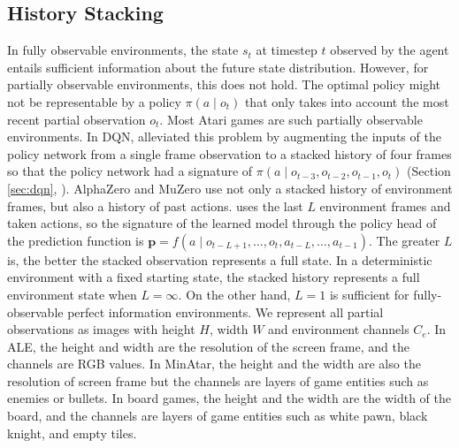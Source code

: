 \subsection{History Stacking} \label{sec:history_stacking}
In fully observable environments, the state $s_t$ at timestep $t$ observed by the agent entails sufficient information about the future state distribution.
However, for partially observable environments, this does not hold.
The optimal policy might not be representable by a policy $\pi(a \mid o_t)$ that only takes into account the most recent partial observation $o_t$.
Most Atari games are such partially observable environments.
In DQN, \citeauthor{PlayingAtariDeep_Mnih.Kavukcuoglu.ea_2013} alleviated this problem by augmenting the inputs of the policy network from a single frame observation to a stacked history of four frames so that the policy network had a signature of $\pi(a \mid o_{t-3}, o_{t-2}, o_{t-1}, o_t)$ (Section \ref{sec:dqn}, \cite{PlayingAtariDeep_Mnih.Kavukcuoglu.ea_2013}).
AlphaZero and MuZero use not only a stacked history of environment frames, but also a history of past actions.
\moozi uses the last $L$ environment frames and taken actions, so the signature of the learned model through the policy head of the prediction function is $\mathbf{p} = f(a \mid o_{t - L + 1}, \dots, o_t, a_{t - L}, \dots, a_{t-1})$.
The greater $L$ is, the better the stacked observation represents a full state.
In a deterministic environment with a fixed starting state, the stacked history represents a full environment state when $L = \infty$.
On the other hand, $L = 1$ is sufficient for fully-observable perfect information environments.
We represent all partial observations as images with height $H$, width $W$ and environment channels $C_e$.
In ALE, the height and width are the resolution of the screen frame, and the channels are RGB values.
In MinAtar, the height and the width are also the resolution of screen frame but the channels are layers of game entities such as enemies or bullets.
In board games, the height and the width are the width of the board, and the channels are layers of game entities such as white pawn, black knight, and empty tiles.

